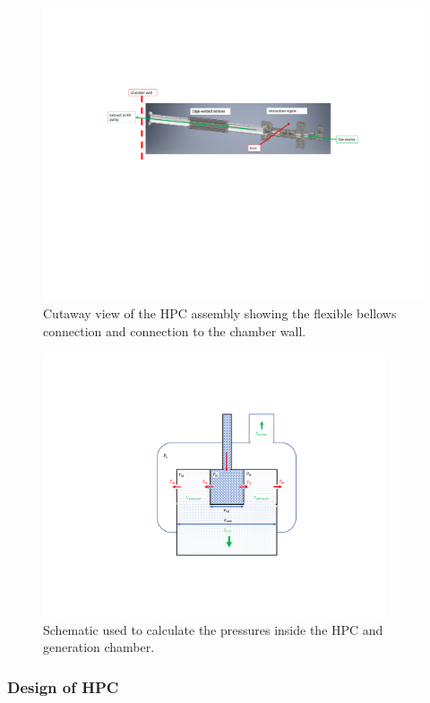 \begin{figure}
	\centering
	\includegraphics[width=1.0\textwidth]{figures/chap3/HPC_cutaway_bellows.pdf}
	\caption{Cutaway view of the HPC assembly showing the flexible bellows connection and connection to the chamber wall.}
	\label{fig:HPC_cutaway_bellows}
\end{figure}

\begin{figure}
	\centering
	\includegraphics[width=0.9\textwidth]{figures/chap3/HPC_pressure_schematic.pdf}
	\caption{Schematic used to calculate the pressures inside the HPC and generation chamber.}
	\label{fig:HPC_pressure_schematic}
\end{figure}

\subsubsection{Design of HPC}

